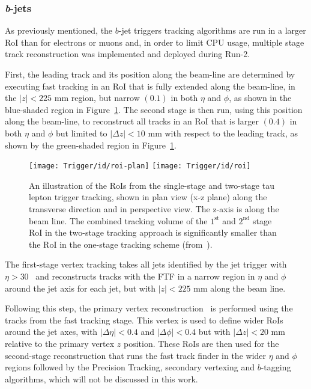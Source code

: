 				\subsubsection*{\emph{b}-jets}

					As previously mentioned, the $b$-jet triggers tracking algorithms are run in a larger \ac{RoI} than for electrons or muons and, in order to limit \ac{CPU} usage, multiple stage track reconstruction was implemented and deployed during Run-2.

					First, the leading track and its position along the beam-line are determined by executing fast tracking in an \ac{RoI} that is fully extended along the beam-line, in the $|z|<225$ mm region, but narrow $(0.1)$ in both $\eta$ and $\phi$, as shown in the blue-shaded region in Figure~\ref{fig:idroi}. The second stage is then run, using this position along the beam-line, to reconstruct all tracks in an \ac{RoI} that is larger $(0.4)$ in both $\eta$ and $\phi$ but limited to $|\Delta z|<10$ mm with respect to the leading track, as shown by the green-shaded region in Figure~\ref{fig:idroi}.

					\begin{figure}[!htb]
						\centering
						\texttt{[image: Trigger/id/roi-plan]}
						\texttt{[image: Trigger/id/roi]}
						\caption{An illustration of the \ac{RoI}s from the single-stage and two-stage tau lepton trigger tracking, shown in plan view (x-z plane) along the transverse direction and in perspective view. The z-axis is along the beam line. The combined tracking volume of the $1^{\mathrm{st}}$ and $2^{\mathrm{nd}}$ stage \ac{RoI} in the two-stage tracking approach is significantly smaller than the \ac{RoI} in the one-stage tracking scheme (from~\cite{ATLASTrigger2015}).}
						\label{fig:idroi}
					\end{figure}

					The first-stage vertex tracking takes all jets identified by the jet trigger with $\eta > 30$ \GeV\ and reconstructs tracks with the \ac{FTF} in a narrow region in $\eta$ and $\phi$ around the jet axis for each jet, but with $|z|<225$ mm along the beam line.
					
					Following this step, the primary vertex reconstruction~\cite{ATLAS-CONF-2010-069} is performed using the tracks from the fast tracking stage. This vertex is used to define wider \ac{RoI}s around
					the jet axes, with $|\Delta\eta|<0.4$ and $|\Delta\phi|<0.4$ but with $|\Delta z|<20$ mm relative to the primary vertex $z$ position. These \ac{RoI}s are then used for the second-stage 
					reconstruction that runs the fast track finder in the wider $\eta$ and $\phi$ regions followed by the Precision Tracking, secondary vertexing and $b$-tagging algorithms, which will not be discussed in this work.

